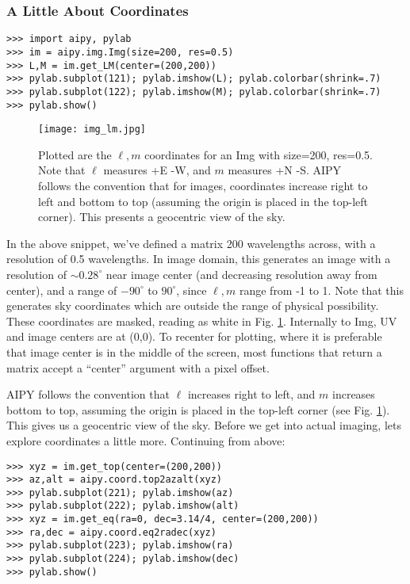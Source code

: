 \subsubsection{A Little About Coordinates}

\begin{verbatim}
>>> import aipy, pylab
>>> im = aipy.img.Img(size=200, res=0.5)
>>> L,M = im.get_LM(center=(200,200))
>>> pylab.subplot(121); pylab.imshow(L); pylab.colorbar(shrink=.7)
>>> pylab.subplot(122); pylab.imshow(M); pylab.colorbar(shrink=.7)
>>> pylab.show()
\end{verbatim}

\begin{figure}
\begin{center}
\texttt{[image: img\_lm.jpg]}
\caption{Plotted are the $\ell,m$ coordinates for an Img with size=200,
res=0.5.  Note that $\ell$ measures +E -W, and $m$ measures +N -S.  AIPY
follows the convention that for images, coordinates increase right to left
and bottom to top (assuming the origin is placed in the top-left corner).  
This presents a geocentric view of the sky.}
\label{fig:img_lm}
\end{center}
\end{figure}

In the above snippet, we've defined a matrix 200 wavelengths across, with a
resolution of 0.5 wavelengths.  In image domain, this generates an image with
a resolution of $\sim0.28^\circ$ near image center (and decreasing resolution
away from center), and a range of $-90^\circ$ to $90^\circ$, since $\ell,m$
range from -1 to 1.  Note that this generates sky coordinates which are
outside the range of physical possibility.  These coordinates are masked,
reading as white in Fig. \ref{fig:img_lm}.  Internally to Img, UV and image
centers are at (0,0).  To recenter for plotting, where it is preferable that
image center is in the middle of the screen, most functions that return a
matrix accept a ``center'' argument with a pixel offset.

AIPY follows the convention that $\ell$ increases right to left, and $m$
increases bottom to top, assuming the origin is placed in the top-left corner
(see Fig. \ref{fig:img_lm}).  This gives us a geocentric view of the sky.
Before we get into actual imaging, lets explore coordinates a little more.
Continuing from above:

\begin{verbatim}
>>> xyz = im.get_top(center=(200,200))
>>> az,alt = aipy.coord.top2azalt(xyz)
>>> pylab.subplot(221); pylab.imshow(az)
>>> pylab.subplot(222); pylab.imshow(alt)
>>> xyz = im.get_eq(ra=0, dec=3.14/4, center=(200,200))
>>> ra,dec = aipy.coord.eq2radec(xyz)
>>> pylab.subplot(223); pylab.imshow(ra)
>>> pylab.subplot(224); pylab.imshow(dec)
>>> pylab.show()
\end{verbatim}

